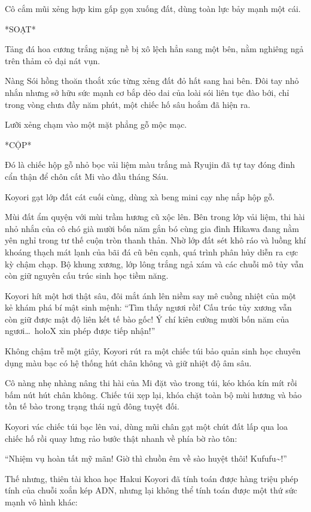 \documentclass[../main.tex]{subfiles}
\begin{document}
Cô cắm mũi xẻng hợp kim gấp gọn xuống đất, dùng toàn lực bảy mạnh một cái.

*SOẠT*

Tảng đá hoa cương trắng nặng nề bị xô lệch hẳn sang một bên, nằm nghiêng ngả trên thảm cỏ dại nát vụn.

Nàng Sói hồng thoăn thoắt xúc từng xẻng đất đỏ hất sang hai bên. Đôi tay nhỏ nhắn nhưng sở hữu sức mạnh cơ bắp dẻo dai của loài sói liên tục đào bới, chỉ trong vòng chưa đầy năm phút, một chiếc hố sâu hoắm đã hiện ra.

Lưỡi xẻng chạm vào một mặt phẳng gỗ mộc mạc.

*CỘP*

Đó là chiếc hộp gỗ nhỏ bọc vải liệm màu trắng mà Ryujin đã tự tay đóng đinh cẩn thận để chôn cất Mi vào đầu tháng Sáu.

Koyori gạt lớp đất cát cuối cùng, dùng xà beng mini cạy nhẹ nắp hộp gỗ.

Mùi đất ẩm quyện với mùi trầm hương cũ xộc lên. Bên trong lớp vải liệm, thi hài nhỏ nhắn của cô chó già mười bốn năm gắn bó cùng gia đình Hikawa đang nằm yên nghỉ trong tư thế cuộn tròn thanh thản. Nhờ lớp đất sét khô ráo và luồng khí khoáng thạch mát lạnh của bãi đá cũ bên cạnh, quá trình phân hủy diễn ra cực kỳ chậm chạp. Bộ khung xương, lớp lông trắng ngả xám và các chuỗi mô tủy vẫn còn giữ nguyên cấu trúc sinh học tiềm năng.

Koyori hít một hơi thật sâu, đôi mắt ánh lên niềm say mê cuồng nhiệt của một kẻ khám phá bí mật sinh mệnh: ``Tìm thấy ngươi rồi! Cấu trúc tủy xương vẫn còn giữ được mật độ liên kết tế bào gốc! Ý chí kiên cường mười bốn năm của ngươi\dots\ holoX xin phép được tiếp nhận!''

Không chậm trễ một giây, Koyori rút ra một chiếc túi bảo quản sinh học chuyên dụng màu bạc có hệ thống hút chân không và giữ nhiệt độ âm sâu.

Cô nàng nhẹ nhàng nâng thi hài của Mi đặt vào trong túi, kéo khóa kín mít rồi bấm nút hút chân không. Chiếc túi xẹp lại, khóa chặt toàn bộ mùi hương và bảo tồn tế bào trong trạng thái ngủ đông tuyệt đối.

Koyori vác chiếc túi bạc lên vai, dùng mũi chân gạt một chút đất lấp qua loa chiếc hố rồi quay lưng rảo bước thật nhanh về phía bờ rào tôn:

``Nhiệm vụ hoàn tất mỹ mãn! Giờ thì chuồn êm về sào huyệt thôi! Kufufu\~{}!''

Thế nhưng, thiên tài khoa học Hakui Koyori đã tính toán được hàng triệu phép tính của chuỗi xoắn kép ADN, nhưng lại không thể tính toán được một thứ sức mạnh vô hình khác:
\end{document}
